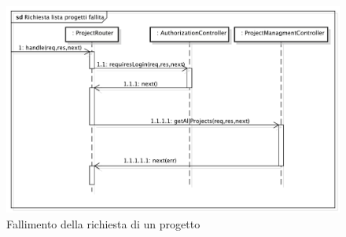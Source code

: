 \begin{center}
\begin{figure}[h]
\centering
\includegraphics[scale=0.35,keepaspectratio]{diagrammi/sequenza/BackEnd/projFailed.pdf}
\caption{Fallimento della richiesta di un progetto}
\end{figure}
\FloatBarrier
\end{center}
